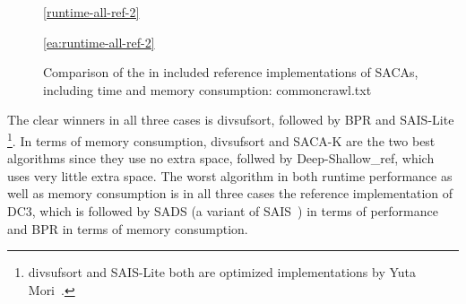\begin{figure}[!h]
    \medskip
    \ref{runtime-all-ref-2}
    \caption{Comparison of the in \sacabench included reference implementations of SACAs, including time and memory consumption: commoncrawl.txt}
    \ref{ea:runtime-all-ref-2}
\end{figure}
\FloatBarrier

The clear winners in all three cases is divsufsort, followed by BPR and SAIS-Lite
\footnote{divsufsort and SAIS-Lite both are optimized implementations by Yuta Mori~\cite{saca:5}.}.
In terms of memory consumption, divsufsort and SACA-K are the two best algorithms since they use no extra space,
follwed by Deep-Shallow\_ref, which uses very little extra space.
The worst algorithm in both runtime performance as well as memory consumption is in all three cases the reference implementation of DC3,
which is followed by SADS (a variant of SAIS~\cite{saca:6}) in terms of performance and BPR in terms of memory consumption.

